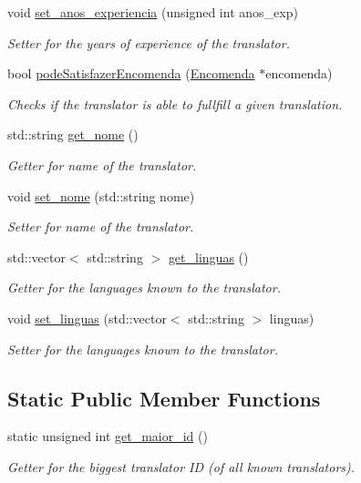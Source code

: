 \begin{DoxyCompactItemize}
void \hyperlink{class_tradutor_a938cfc1c263b3504fc4d7fbdc939b087}{set\-\_\-anos\-\_\-experiencia} (unsigned int anos\-\_\-exp)
\begin{DoxyCompactList}\small\item\em Setter for the years of experience of the translator. \end{DoxyCompactList}\item 
bool \hyperlink{class_tradutor_a1d22a38c8eaa3753d44b521bb3aab2af}{pode\-Satisfazer\-Encomenda} (\hyperlink{class_encomenda}{Encomenda} $\ast$encomenda)
\begin{DoxyCompactList}\small\item\em Checks if the translator is able to fullfill a given translation. \end{DoxyCompactList}\item 
std\-::string \hyperlink{class_tradutor_a3547a7d337cd421be409e5bf63418964}{get\-\_\-nome} ()
\begin{DoxyCompactList}\small\item\em Getter for name of the translator. \end{DoxyCompactList}\item 
void \hyperlink{class_tradutor_aa50fdceab0ca03dfe5c2a1639bc5869e}{set\-\_\-nome} (std\-::string nome)
\begin{DoxyCompactList}\small\item\em Setter for name of the translator. \end{DoxyCompactList}\item 
std\-::vector$<$ std\-::string $>$ \hyperlink{class_tradutor_a011b86fa2dae11c6ccdda1cbeb844e94}{get\-\_\-linguas} ()
\begin{DoxyCompactList}\small\item\em Getter for the languages known to the translator. \end{DoxyCompactList}\item 
void \hyperlink{class_tradutor_a83ed5b48e00f3a15c579e209bb01d53f}{set\-\_\-linguas} (std\-::vector$<$ std\-::string $>$ linguas)
\begin{DoxyCompactList}\small\item\em Setter for the languages known to the translator. \end{DoxyCompactList}\end{DoxyCompactItemize}
\subsection*{Static Public Member Functions}
\begin{DoxyCompactItemize}
\item 
static unsigned int \hyperlink{class_tradutor_af2caad7e33c443f238851c5bb2d63930}{get\-\_\-maior\-\_\-id} ()
\begin{DoxyCompactList}\small\item\em Getter for the biggest translator I\-D (of all known translators). \end{DoxyCompactList}\end{DoxyCompactItemize}


